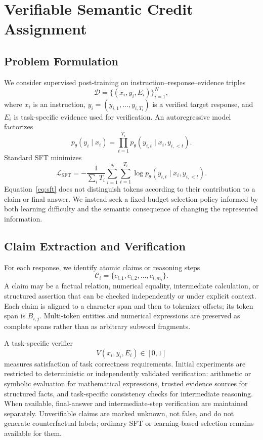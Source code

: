 \documentclass{article}
\newcommand{\loss}{\mathcal{L}}
\newcommand{\dataset}{\mathcal{D}}
\newcommand{\claims}{\mathcal{C}}
\begin{document}
\section{Verifiable Semantic Credit Assignment}
\label{sec:method}

\subsection{Problem Formulation}
We consider supervised post-training on instruction--response--evidence triples
\begin{equation}
  \dataset=\{(x_i,y_i,E_i)\}_{i=1}^{N},
\end{equation}
where $x_i$ is an instruction, $y_i=(y_{i,1},\ldots,y_{i,T_i})$ is a verified target response, and $E_i$ is task-specific evidence used for verification. An autoregressive model factorizes
\begin{equation}
 p_\theta(y_i\mid x_i)=\prod_{t=1}^{T_i}p_\theta(y_{i,t}\mid x_i,y_{i,<t}).
\end{equation}
Standard SFT minimizes
\begin{equation}
 \loss_{\mathrm{SFT}}=-\frac{1}{\sum_iT_i}\sum_{i=1}^{N}\sum_{t=1}^{T_i}\log p_\theta(y_{i,t}\mid x_i,y_{i,<t}).
 \label{eq:sft}
\end{equation}
Equation~\eqref{eq:sft} does not distinguish tokens according to their contribution to a claim or final answer. We instead seek a fixed-budget selection policy informed by both learning difficulty and the semantic consequence of changing the represented information.

\subsection{Claim Extraction and Verification}
For each response, we identify atomic claims or reasoning steps
\begin{equation}
 \claims_i=\{c_{i,1},c_{i,2},\ldots,c_{i,m_i}\}.
\end{equation}
A claim may be a factual relation, numerical equality, intermediate calculation, or structured assertion that can be checked independently or under explicit context. Each claim is aligned to a character span and then to tokenizer offsets; its token span is $B_{i,j}$. Multi-token entities and numerical expressions are preserved as complete spans rather than as arbitrary subword fragments.

A task-specific verifier
\begin{equation}
 V(x_i,y_i,E_i)\in[0,1] 
 \label{eq:verifier}
\end{equation}
measures satisfaction of task correctness requirements. Initial experiments are restricted to deterministic or independently validated verification: arithmetic or symbolic evaluation for mathematical expressions, trusted evidence sources for structured facts, and task-specific consistency checks for intermediate reasoning. When available, final-answer and intermediate-step verification are maintained separately. Unverifiable claims are marked unknown, not false, and do not generate counterfactual labels; ordinary SFT or learning-based selection remains available for them.
\end{document}
